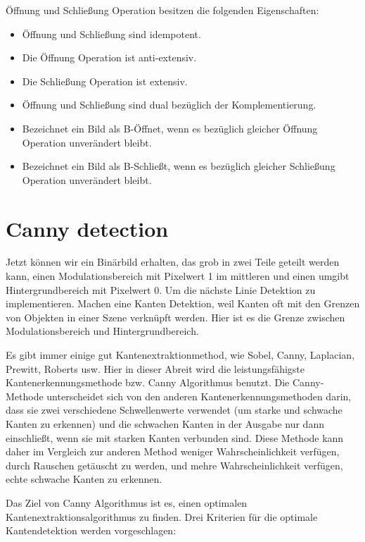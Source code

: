 Öffnung und Schließung Operation besitzen die folgenden Eigenschaften:

\begin{itemize}

\item Öffnung und Schließung sind idempotent.
\item Die Öffnung Operation ist anti-extensiv. 
\item Die Schließung Operation ist extensiv.
\item Öffnung und Schließung sind dual bezüglich der Komplementierung.
\item Bezeichnet ein Bild als B-Öffnet, wenn es bezüglich gleicher Öffnung Operation unverändert bleibt. 
\item Bezeichnet ein Bild als B-Schließt, wenn es bezüglich gleicher Schließung Operation unverändert bleibt. 

\end{itemize}


\section{Canny detection}

Jetzt können wir ein Binärbild erhalten, das grob in zwei Teile geteilt werden kann, einen Modulationsbereich mit Pixelwert 1 im mittleren und einen umgibt Hintergrundbereich mit Pixelwert 0. Um die nächste Linie Detektion zu implementieren. Machen eine Kanten Detektion, weil Kanten oft mit den Grenzen von Objekten in einer Szene verknüpft werden. Hier ist es die Grenze zwischen Modulationsbereich und Hintergrundbereich. \cite{canny}

Es gibt immer einige gut Kantenextraktionmethod, wie Sobel, Canny, Laplacian, Prewitt, Roberts usw. Hier in dieser Abreit wird die leistungsfähigste Kantenerkennungsmethode bzw. Canny Algorithmus benutzt. Die Canny-Methode unterscheidet sich von den anderen Kantenerkennungsmethoden darin, dass sie zwei verschiedene Schwellenwerte verwendet (um starke und schwache Kanten zu erkennen) und die schwachen Kanten in der Ausgabe nur dann einschließt, wenn sie mit starken Kanten verbunden sind. Diese Methode kann daher im Vergleich zur anderen Method weniger Wahrscheinlichkeit verfügen, durch Rauschen getäuscht zu werden, und mehre Wahrscheinlichkeit verfügen, echte schwache Kanten zu erkennen.

Das Ziel von Canny Algorithmus ist es, einen optimalen Kantenextraktionsalgorithmus zu finden. Drei Kriterien für die optimale Kantendetektion werden vorgeschlagen:

